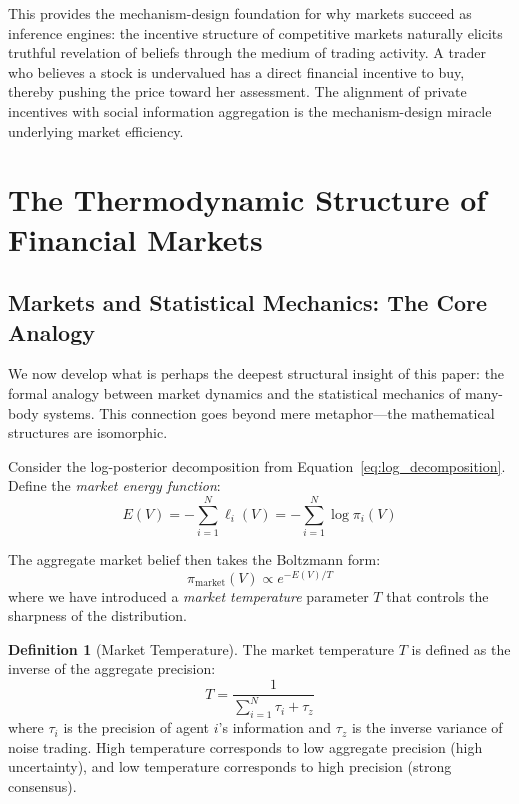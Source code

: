 \documentclass[12pt,a4paper]{article}
\theoremstyle{definition}
\newtheorem{definition}[theorem]{Definition}
\begin{document}
This provides the mechanism-design foundation for why markets succeed as inference engines: the incentive structure of competitive markets naturally elicits truthful revelation of beliefs through the medium of trading activity. A trader who believes a stock is undervalued has a direct financial incentive to buy, thereby pushing the price toward her assessment. The alignment of private incentives with social information aggregation is the mechanism-design miracle underlying market efficiency.



\section{The Thermodynamic Structure of Financial Markets}\label{sec:thermo}

\subsection{Markets and Statistical Mechanics: The Core Analogy}

We now develop what is perhaps the deepest structural insight of this paper: the formal analogy between market dynamics and the statistical mechanics of many-body systems. This connection goes beyond mere metaphor---the mathematical structures are isomorphic.

Consider the log-posterior decomposition from Equation~\eqref{eq:log_decomposition}. Define the \emph{market energy function}:
\begin{equation}\label{eq:market_energy}
    E(V) = -\sum_{i=1}^{N} \ell_i(V) = -\sum_{i=1}^{N} \log \pi_i(V)
\end{equation}

The aggregate market belief then takes the Boltzmann form:
\begin{equation}\label{eq:boltzmann}
    \pi_{\text{market}}(V) \propto e^{-E(V)/T}
\end{equation}
where we have introduced a \emph{market temperature} parameter $T$ that controls the sharpness of the distribution.

\begin{definition}[Market Temperature]\label{def:market_temp}
The market temperature $T$ is defined as the inverse of the aggregate precision:
\begin{equation}
    T = \frac{1}{\sum_{i=1}^{N} \tau_i + \tau_z}
\end{equation}
where $\tau_i$ is the precision of agent $i$'s information and $\tau_z$ is the inverse variance of noise trading. High temperature corresponds to low aggregate precision (high uncertainty), and low temperature corresponds to high precision (strong consensus).
\end{definition}
\end{document}
